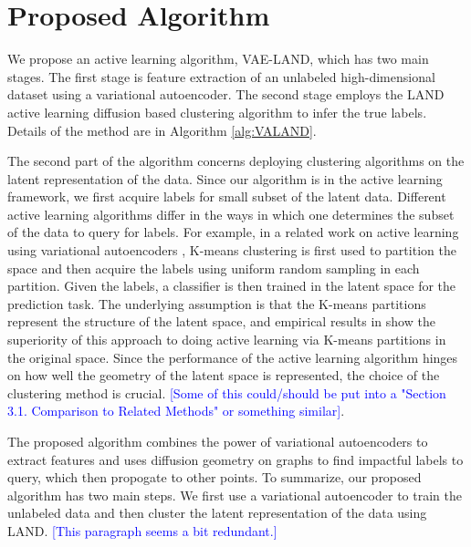 \documentclass{article}
\newcommand{\JMM}[1]{{\textcolor{blue}{[#1]}}}
\begin{document}
\section{Proposed Algorithm}
\label{sec:ProposedAlgorithm}
We propose an active learning algorithm, VAE-LAND, which has two main stages. The first stage is feature extraction of an unlabeled high-dimensional dataset using a variational autoencoder. The second stage employs the LAND active learning diffusion based clustering algorithm to infer the true labels. Details of the method are in Algorithm \ref{alg:VALAND}.

The second part of the algorithm concerns deploying clustering algorithms on the latent representation of the data. Since our algorithm is in the active learning framework, we first acquire labels for small subset of the latent data. Different active learning algorithms differ in the ways in which one determines the subset of the data to query for labels. For example, in a related work on active learning using variational autoencoders \cite{pourkamali2019effectiveness}, K-means clustering is first used to partition the space and then acquire the labels using uniform random sampling in each partition. Given the labels, a classifier is then trained in the latent space for the prediction task. The underlying assumption is that the K-means partitions represent the structure of the latent space, and empirical results in \cite{pourkamali2019effectiveness} show the superiority of this approach to doing active learning via K-means partitions in the original space.
Since the performance of the active learning algorithm hinges on how well the geometry of the latent space is represented, the choice of the clustering method is crucial. \JMM{Some of this could/should be put into a "Section 3.1. Comparison to Related Methods" or something similar}.


The proposed algorithm combines the power of variational autoencoders to extract features and uses diffusion geometry on graphs to find impactful labels to query, which then propogate to other points. To summarize, our proposed algorithm has two main steps.  We first use a variational autoencoder to train the unlabeled data and then cluster the latent representation of the data using LAND.  \JMM{This paragraph seems a bit redundant.}
\end{document}
